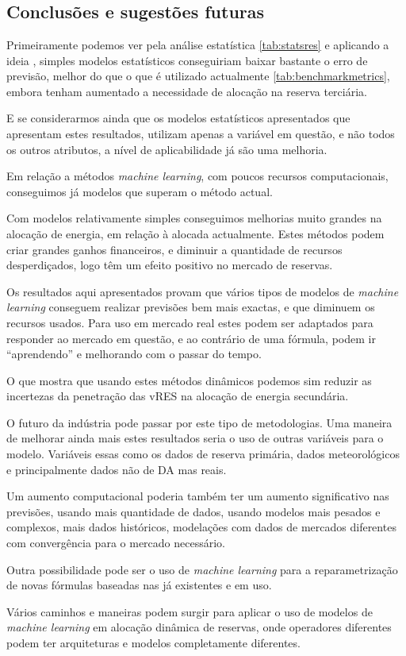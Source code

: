 \part[]{}{}

\chapter{Conclusões e sugestões futuras}

Primeiramente podemos ver pela análise estatística \ref{tab:statsres} e aplicando a ideia \cite{Elsayed}, simples modelos estatísticos conseguiriam baixar bastante o erro de previsão, melhor do que o que é utilizado actualmente \ref{tab:benchmarkmetrics}, embora tenham aumentado a necessidade de alocação na reserva terciária.\par
E se considerarmos ainda que os modelos estatísticos apresentados que apresentam estes resultados, utilizam apenas a variável em questão, e não todos os outros atributos, a nível de aplicabilidade já são uma melhoria.\par
Em relação a métodos \textit{machine learning}, com poucos recursos computacionais, conseguimos já modelos que superam o método actual.\par
Com modelos relativamente simples conseguimos melhorias muito grandes na alocação de energia, em relação à alocada actualmente. Estes métodos podem criar grandes ganhos financeiros, e diminuir a quantidade de recursos desperdiçados, logo têm um efeito positivo no mercado de reservas.\par
Os resultados aqui apresentados provam que vários tipos de modelos de \textit{machine learning} conseguem realizar previsões bem mais exactas, e que diminuem os recursos usados. Para uso em mercado real estes podem ser adaptados para responder ao mercado em questão, e ao contrário de uma fórmula, podem ir “aprendendo” e melhorando com o passar do tempo.\par
O que mostra que usando estes métodos dinâmicos podemos sim reduzir as incertezas da penetração das \gls{vRES} na alocação de energia secundária.\par
O futuro da indústria pode passar por este tipo de metodologias. Uma maneira de melhorar ainda mais estes resultados seria o uso de outras variáveis para o modelo. Variáveis essas como os dados de reserva primária, dados meteorológicos e principalmente dados não de \gls{DA} mas reais.\par
Um aumento computacional poderia também ter um aumento significativo nas previsões, usando mais quantidade de dados, usando modelos mais pesados e complexos, mais dados históricos, modelações com dados de mercados diferentes com convergência para o mercado necessário.\par
Outra possibilidade pode ser o uso de \textit{machine learning} para a reparametrização de novas fórmulas baseadas nas já existentes e em uso.\par
Vários caminhos e maneiras podem surgir para aplicar o uso de modelos de \textit{machine learning} em alocação dinâmica de reservas, onde operadores diferentes podem ter arquiteturas e modelos completamente diferentes.
